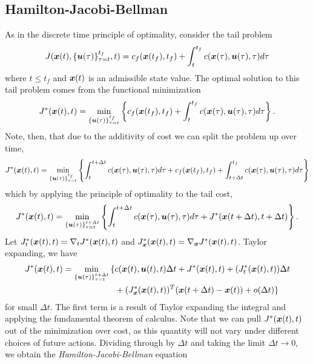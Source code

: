 \subsection{Hamilton-Jacobi-Bellman}

As in the discrete time principle of optimality, consider the tail problem
\begin{equation}
    J(\bm{x}(t),\{\bm{u}(\tau)\}_{\tau=t}^{t_f},t) = c_f(\bm{x}(t_f),t_f) + \int_t^{t_f} c(\bm{x}(\tau),\bm{u}(\tau),\tau) d\tau
\end{equation}
where $t\leq t_f$ and $\bm{x}(t)$ is an admissible state value. The optimal solution to this tail problem comes from the functional minimization
\begin{equation}
    J^*(\bm{x}(t),t) = \min_{\{\bm{u}(\tau)\}_{\tau=t}^{t_f}} \left\{ c_f(\bm{x}(t_f),t_f) + \int_t^{t_f} c(\bm{x}(\tau),\bm{u}(\tau),\tau) d\tau\right\}.
\end{equation}
Note, then, that due to the additivity of cost we can split the problem up over time,
\begin{equation}
    J^*(\bm{x}(t),t) = \min_{\{\bm{u}(\tau)\}_{\tau=t}^{t_f}} \left\{ \int_t^{t+\Delta t} c(\bm{x}(\tau),\bm{u}(\tau),\tau) d\tau + c_f(\bm{x}(t_f),t_f) + \int_{t+\Delta t}^{t_f} c(\bm{x}(\tau),\bm{u}(\tau),\tau) d\tau\right\}
\end{equation}    
which by applying the principle of optimality to the tail cost,
\begin{equation}
     J^*(\bm{x}(t),t) = \min_{\{\bm{u}(\tau)\}_{\tau=t}^{t + \Delta t}} \left\{ \int_t^{t+\Delta t} c(\bm{x}(\tau),\bm{u}(\tau),\tau) d\tau + J^*(\bm{x}(t + \Delta t), t + \Delta t)\right\}.
\end{equation}
Let $J^*_t(\bm{x}(t),t) = \nabla_t J^* (\bm{x}(t),t)$ and $J^*_{\bm{x}}(\bm{x}(t),t) = \nabla_{\bm{x}} J^* (\bm{x}(t),t)$. Taylor expanding, we have 
\begin{align}
\J^*(\st(t),t) = \min_{\{\ac(\tau)\}_{\tau=t}^{t + \Delta t}} \huge{\{} &\cost(\st(t),\ac(t),t) \Delta t + \J^*(\st(t),t) + (\J_t^*(\st(t),t)) \Delta t \\
&+ (\J_{\st}^*(\st(t),t))^T (\st(t+\Delta t) - \st(t))  + o(\Delta t) \huge{\}} \nonumber
\end{align}
for small $\Delta t$. The first term is a result of Taylor expanding the integral and applying the fundamental theorem of calculus. Note that we can pull $J^*(\bm{x}(t),t)$ out of the minimization over cost, as this quantity will not vary under different choices of future actions. Dividing through by $\Delta t$ and taking the limit $\Delta t \to 0$, we obtain the \textit{Hamilton-Jacobi-Bellman} equation
